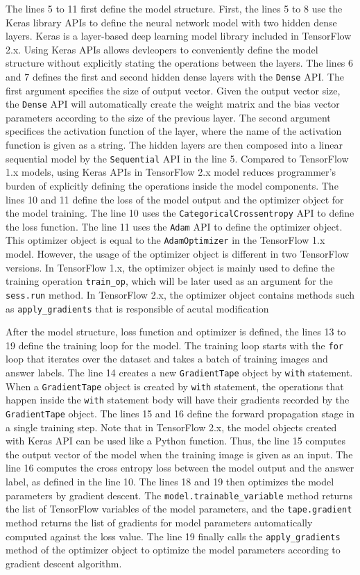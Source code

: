 The lines 5 to 11 first define the model structure.
First, the lines 5 to 8 use the Keras library APIs to define the neural
network model with two hidden dense layers.
Keras is a layer-based deep learning model library included in TensorFlow 2.x.
Using Keras APIs allows devleopers to conveniently define the model
structure without explicitly stating the operations between the layers.
The lines 6 and 7 defines the first and second hidden dense layers
with the {\tt Dense} API.
The first argument specifies the size of output vector.
Given the output vector size, the {\tt Dense} API will automatically create
the weight matrix and the bias vector parameters according to the size of 
the previous layer.
The second argument specifices the activation function of the layer,
where the name of the activation function is given as a string. 
The hidden layers are then composed into a linear sequential model
by the {\tt Sequential} API in the line 5.
Compared to TensorFlow 1.x models, using Keras APIs in TensorFlow 2.x model
reduces programmer's burden of explicitly defining the operations inside
the model components.
The lines 10 and 11 define the loss of the model output and
the optimizer object for the model training.
The line 10 uses the {\tt CategoricalCrossentropy} API to 
define the loss function.
The line 11 uses the {\tt Adam} API to define the optimizer object.
This optimizer object is equal to the {\tt AdamOptimizer} in the TensorFlow
1.x model.
However, the usage of the optimizer object is different in two TensorFlow
versions.
In TensorFlow 1.x, the optimizer object is mainly used to define the
training operation {\tt train\_op}, which will be later used as an argument
for the {\tt sess.run} method.
In TensorFlow 2.x, the optimizer object contains methods such as
{\tt apply\_gradients} that is responsible of acutal modification 

After the model structure, loss function and optimizer is defined,
the lines 13 to 19 define the training loop for the model.
The training loop starts with the {\tt for} loop that iterates over the dataset
and takes a batch of training images and answer labels.
The line 14 creates a new {\tt GradientTape} object by {\tt with} statement.
When a {\tt GradientTape} object is created by {\tt with} statement,
the operations that happen inside the {\tt with} statement body will
have their gradients recorded by the {\tt GradientTape} object.
The lines 15 and 16 define the forward propagation stage in a single
training step.
Note that in TensorFlow 2.x, the model objects created with Keras API can be
used like a Python function.
Thus, the line 15 computes the output vector of the model when the
training image is given as an input.
The line 16 computes the cross entropy loss between the model output and
the answer label, as defined in the line 10.
The lines 18 and 19 then optimizes the model parameters by gradient descent. 
The {\tt model.trainable\_variable} method returns the list of 
TensorFlow variables of the model parameters,
and the {\tt tape.gradient} method returns the list of
gradients for model parameters automatically computed against the
loss value.
The line 19 finally calls the {\tt apply\_gradients} method of the optimizer
object to optimize the model parameters according to gradient descent algorithm.


